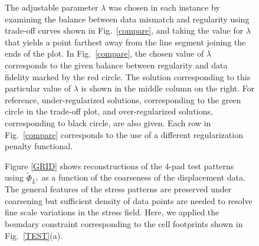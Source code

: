 \documentclass[aps,prl,reprint,twocolumn,groupedaddress,showpacs]{revtex4}
\begin{document}
\begin{figure}
The adjustable parameter $\lambda$ was chosen in each instance by
examining the balance between data mismatch and regularity using
trade-off curves shown in Fig.~\ref{compare}, and taking the value
for $\lambda$ that yields a point farthest away from the line segment
joining the ends of the plot. In Fig.~\ref{compare}, the chosen value
of $\lambda$ corresponds to the given balance between regularity and
data fidelity marked by the red circle. The solution corresponding to
this particular value of $\lambda$ is shown in the middle column on
the right. For reference, under-regularized solutions, corresponding
to the green circle in the trade-off plot, and over-regularized
solutions, corresponding to black circle, are also given. Each row in
Fig.~\ref{compare} corresponds to the use of a different
regularization penalty functional. 

Figure \ref{GRID} shows reconstructions of the 4-pad test patterns
using $\tilde{\Phi}_{L^{1}}$ as a function of the coarseness of the
displacement data. The general features of the stress patterns are
preserved under coarsening but sufficient density of data points are
needed to resolve fine scale variations in the stress field. Here, we
applied the boundary constraint corresponding to the cell footprints
shown in Fig.~\ref{TEST}(a).


\end{figure}
\end{document}
